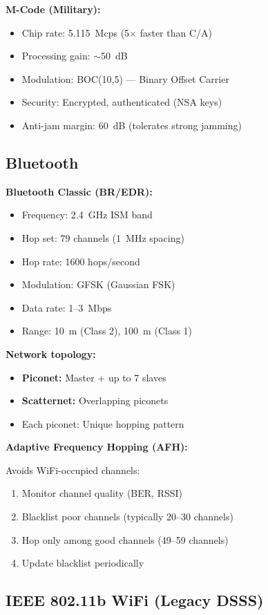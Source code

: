 \textbf{M-Code (Military):}
\begin{itemize}
\item Chip rate: 5.115~Mcps (5$\times$ faster than C/A)
\item Processing gain: $\sim$50~dB
\item Modulation: BOC(10,5) --- Binary Offset Carrier
\item Security: Encrypted, authenticated (NSA keys)
\item Anti-jam margin: 60~dB (tolerates strong jamming)
\end{itemize}

\subsection{Bluetooth}

\textbf{Bluetooth Classic (BR/EDR):}
\begin{itemize}
\item Frequency: 2.4~GHz ISM band
\item Hop set: 79 channels (1~MHz spacing)
\item Hop rate: 1600 hops/second
\item Modulation: GFSK (Gaussian FSK)
\item Data rate: 1--3~Mbps
\item Range: 10~m (Class 2), 100~m (Class 1)
\end{itemize}

\textbf{Network topology:}
\begin{itemize}
\item \textbf{Piconet:} Master + up to 7 slaves
\item \textbf{Scatternet:} Overlapping piconets
\item Each piconet: Unique hopping pattern
\end{itemize}

\textbf{Adaptive Frequency Hopping (AFH):}

Avoids WiFi-occupied channels:
\begin{enumerate}
\item Monitor channel quality (BER, RSSI)
\item Blacklist poor channels (typically 20--30 channels)
\item Hop only among good channels (49--59 channels)
\item Update blacklist periodically
\end{enumerate}

\subsection{IEEE 802.11b WiFi (Legacy DSSS)}

